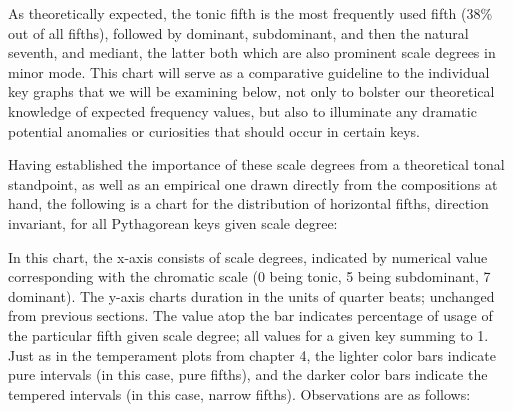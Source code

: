     As theoretically expected, the tonic fifth is the most frequently used
fifth (38\% out of all fifths), followed by dominant, subdominant, and
then the natural seventh, and mediant, the latter both which are also
prominent scale degrees in minor mode. This chart will serve as a
comparative guideline to the individual key graphs that we will be
examining below, not only to bolster our theoretical knowledge of
expected frequency values, but also to illuminate any dramatic potential
anomalies or curiosities that should occur in certain keys.

Having established the importance of these scale degrees from a
theoretical tonal standpoint, as well as an empirical one drawn directly
from the compositions at hand, the following is a chart for the
distribution of horizontal fifths, direction invariant, for all
Pythagorean keys given scale degree:


    \begin{center}
    \end{center}
    
    In this chart, the x-axis consists of scale degrees, indicated by
numerical value corresponding with the chromatic scale (0 being tonic, 5
being subdominant, 7 dominant). The y-axis charts duration in the units
of quarter beats; unchanged from previous sections. The value atop the
bar indicates percentage of usage of the particular fifth given scale
degree; all values for a given key summing to 1. Just as in the
temperament plots from chapter 4, the lighter color bars indicate pure
intervals (in this case, pure fifths), and the darker color bars
indicate the tempered intervals (in this case, narrow fifths).
Observations are as follows:

